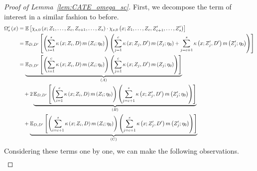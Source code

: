 \begin{proof}[Proof of Lemma~\ref{lem:CATE_omega_sc}]
    First, we decompose the term of interest in a similar fashion to before.
	\begin{equation}
        \begin{aligned}
            \Omega_{s}^{c}\left(x\right)
		    & = \mathbb{E}\left[\chi_{s,0}\left(x; Z_1, \ldots, Z_{c}, Z_{c+1}, \ldots, Z_{s}\right) \cdot
			\chi_{s,0}\left(x; Z_1, \ldots,Z_{c}, Z_{c+1}^{\prime}, \ldots, Z_{s}^{\prime}\right)\right]\\
            & = \mathbb{E}_{D, D^{\prime}}\left[
                \left(\sum_{i = 1}^{s} \kappa\left(x; Z_{i}, D\right) m\left(Z_{i}; \eta_{0}\right)\right) 
                \left(\sum_{j = 1}^{c} \kappa\left(x; Z_{j}, D^{\prime}\right) m\left(Z_{j}; \eta_{0}\right) + \sum_{j = c + 1}^{s} \kappa\left(x; Z_{j}^{\prime}, D^{\prime}\right) m\left(Z_{j}^{\prime}; \eta_{0}\right)\right)
            \right]\\
            & = \underbrace{\mathbb{E}_{D, D^{\prime}}\left[\left(\sum_{i = 1}^{c} \kappa\left(x; Z_{i}, D\right) m\left(Z_{i}; \eta_{0}\right)\right)
            \left(\sum_{j = 1}^{c} \kappa\left(x; Z_{j}, D^{\prime}\right) m\left(Z_{j}; \eta_{0}\right)\right)\right]}_{(A)} \\
            & \quad + 2\underbrace{\mathbb{E}_{D, D^{\prime}}\left[\left(\sum_{i = 1}^{c} \kappa\left(x; Z_{i}, D\right) m\left(Z_{i}; \eta_{0}\right)\right)
            \left(\sum_{j = c + 1}^{s} \kappa\left(x; Z_{j}^{\prime}, D^{\prime}\right) m\left(Z_{j}^{\prime}; \eta_{0}\right)\right)\right]}_{(B)} \\
            & \quad + \underbrace{\mathbb{E}_{D, D^{\prime}}\left[\left(\sum_{i = c + 1}^{s} \kappa\left(x; Z_{i}, D\right) m\left(Z_{i}; \eta_{0}\right)\right)
            \left(\sum_{j = c + 1}^{s} \kappa\left(x; Z_{j}^{\prime}, D^{\prime}\right) m\left(Z_{j}^{\prime}; \eta_{0}\right)\right)\right]}_{(C)} 
        \end{aligned}
    \end{equation}
    Considering these terms one by one, we can make the following observations.
    \begin{equation}
        \begin{aligned}

\end{aligned}
\end{equation}
\end{proof}
